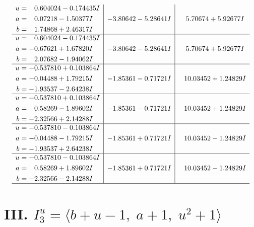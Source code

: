 \documentclass[1p]{elsarticle_modified}
\theoremstyle{definition}
\begin{document}
$$\begin{array}{c|c|c}
\begin{aligned}
u &= \phantom{-}0.604024 - 0.174435 I \\
a &= \phantom{-}0.07218 - 1.50377 I \\
b &= \phantom{-}1.74868 + 2.46317 I\end{aligned}
 & -3.80642 - 5.28641 I & \phantom{-}5.70674 + 5.92677 I \\ \hline\begin{aligned}
u &= \phantom{-}0.604024 - 0.174435 I \\
a &= -0.67621 + 1.67820 I \\
b &= \phantom{-}2.07682 - 1.94062 I\end{aligned}
 & -3.80642 - 5.28641 I & \phantom{-}5.70674 + 5.92677 I \\ \hline\begin{aligned}
u &= -0.537810 + 0.103864 I \\
a &= -0.04488 + 1.79215 I \\
b &= -1.93537 - 2.64238 I\end{aligned}
 & -1.85361 - 0.71721 I & \phantom{-}10.03452 + 1.24829 I \\ \hline\begin{aligned}
u &= -0.537810 + 0.103864 I \\
a &= \phantom{-}0.58269 - 1.89602 I \\
b &= -2.32566 + 2.14288 I\end{aligned}
 & -1.85361 - 0.71721 I & \phantom{-}10.03452 + 1.24829 I \\ \hline\begin{aligned}
u &= -0.537810 - 0.103864 I \\
a &= -0.04488 - 1.79215 I \\
b &= -1.93537 + 2.64238 I\end{aligned}
 & -1.85361 + 0.71721 I & \phantom{-}10.03452 - 1.24829 I \\ \hline\begin{aligned}
u &= -0.537810 - 0.103864 I \\
a &= \phantom{-}0.58269 + 1.89602 I \\
b &= -2.32566 - 2.14288 I\end{aligned}
 & -1.85361 + 0.71721 I & \phantom{-}10.03452 - 1.24829 I\\
 \hline 
 \end{array}$$\newpage\newpage\renewcommand{\arraystretch}{1}
\centering \section*{III. $I^u_{3}= \langle b+u-1,\;a+1,\;u^2+1 \rangle$}
\end{document}
